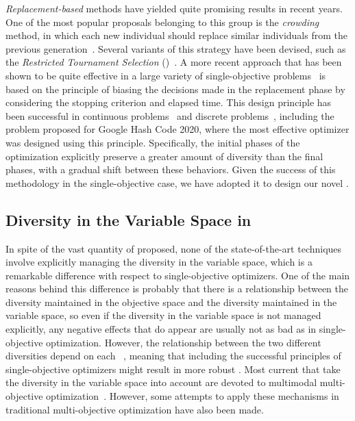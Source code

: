 \textit{Replacement-based} methods have yielded quite promising results in recent years.
%
One of the most popular proposals belonging to this group is the \textit{crowding} method, 
in which each new individual should replace similar individuals from the previous generation~\cite{mengshoel2014adaptive}.
%
Several variants of this strategy have been devised, such as the \textit{Restricted Tournament Selection} 
(\RTS{})~\cite{harik1995finding}.
%
A more recent approach that has been shown to be quite effective in a large variety of single-objective problems~\cite{segura2016improving}
is based on the principle of biasing the decisions made in the replacement phase by considering the 
stopping criterion and elapsed time.
%
This design principle has been successful in continuous problems~\cite{castillo2019differential} and discrete 
problems~\cite{segura2016improving,romero2018memetic}, including the problem proposed for Google Hash Code 2020, where the most
effective optimizer was designed using this principle.
%
Specifically, the initial phases of the optimization explicitly preserve a greater amount of diversity than the final phases, with a
gradual shift between these behaviors.
%
Given the success of this methodology in the single-objective case, we have adopted it to design our novel \MOEA{}.


\subsection{Diversity in the Variable Space in \MOEAS{}}\label{MOEAs:Diversity}

In spite of the vast quantity of \MOEAS{} proposed, none of the state-of-the-art techniques involve
explicitly managing the diversity in the variable space, which is a remarkable difference with respect
to single-objective optimizers.
%
One of the main reasons behind this difference is probably that there is a relationship between the diversity maintained in the objective 
space and the diversity maintained in the variable space, so even if the diversity in the variable space is not managed explicitly,
any negative effects that do appear are usually not as bad as in single-objective optimization.
%
%
However, the relationship between the two different diversities depend on each \MOP{}~\cite{shir2009enhancing}, meaning
that including the successful principles of single-objective optimizers might result in more robust \MOEAS{}.
%
Most current \MOEAS{} that take the diversity in the variable space into account are devoted to multimodal 
multi-objective optimization~\cite{deb2008omni, cuate2019variation}.
%
However, some attempts to apply these mechanisms in traditional multi-objective optimization have also been made.

